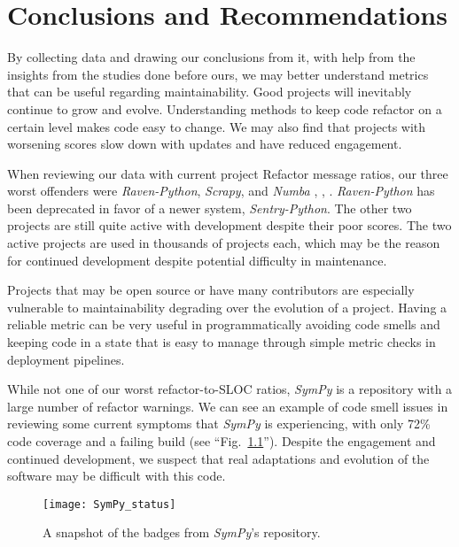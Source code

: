 \chapter{Conclusions and Recommendations} \label{chapterConclusion}


By collecting data and drawing our conclusions from it, with help from the insights from the studies done before ours, we may better understand metrics that can be useful regarding maintainability. Good projects will inevitably continue to grow and evolve. Understanding methods to keep code refactor on a certain level makes code easy to change. We may also find that projects with worsening scores slow down with updates and have reduced engagement.

When reviewing our data with current project Refactor message ratios, our three worst offenders were \emph{Raven-Python}, \emph{Scrapy}, and \emph{Numba} \cite{data:raven-python}, \cite{data:scrapy}, \cite{data:numba}.  \emph{Raven-Python} has been deprecated in favor of a newer system,  \emph{Sentry-Python}. The other two projects are still quite active with development despite their poor scores. The two active projects are used in thousands of projects each, which may be the reason for continued development despite potential difficulty in maintenance.

Projects that may be open source or have many contributors are especially vulnerable to maintainability degrading over the evolution of a project. Having a reliable metric can be very useful in programmatically avoiding code smells and keeping code in a state that is easy to manage through simple metric checks in deployment pipelines.

While not one of our worst refactor-to-SLOC ratios, \emph{SymPy} is a repository with a large number of refactor warnings. We can see an example of code smell issues in reviewing some current symptoms that \emph{SymPy} is experiencing, with only 72\% code coverage and a failing build (see ``Fig.~\ref{figSymPyStatus}''). Despite the engagement and continued development, we suspect that real adaptations and evolution of the software may be difficult with this code.

\begin{figure}[ht]
  \centerline{
    \texttt{[image: SymPy\_status]}
  }
  \caption{A snapshot of the badges from \emph{SymPy}'s repository.}
    \label{figSymPyStatus}
\end{figure}

